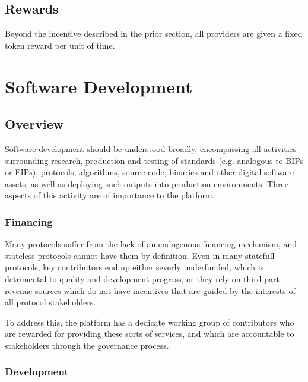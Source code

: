 \documentclass{article}
\begin{document}
\subsection{Rewards}

Beyond the incentive described in the prior section, all providers are given a fixed token reward per unit of time.

\section{Software Development}

\subsection{Overview}

Software development should be understood broadly, encompassing all activities surrounding research, production and testing of standards (e.g. analogous to BIPs or EIPs), protocols, algorithms, source code, binaries and other digital software assets, as well as deploying such outputs into production environments. Three aspects of this activity are of importance to the platform.

\subsubsection{Financing}

Many protocols suffer from the lack of an endogenous financing mechanism, and stateless protocols cannot have them by definition. Even in many statefull protocols, key contributors end up either severly underfunded, which is detrimental to quality and development progress, or they rely on third part revenue sources which do not have incentives that are guided by the interests of all protocol stakeholders.

To address this, the platform has a dedicate working group of contributors who are rewarded for providing these sorts of services, and which are accountable to stakeholders through the governance process.

\subsubsection{Development}
\end{document}
